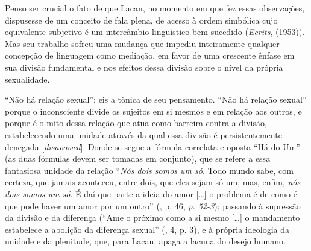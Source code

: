 Penso ser crucial o fato de que Lacan, no momento em que fez essas
observações, dispusesse de um conceito de fala plena, de acesso à ordem
simbólica cujo equivalente subjetivo é um intercâmbio linguístico bem
sucedido (\emph{Ecrits}, (1953)). Mas seu trabalho sofreu uma mudança
que impediu inteiramente qualquer concepção de linguagem como mediação,
em favor de uma crescente ênfase em sua divisão fundamental e nos
efeitos dessa divisão sobre o nível da própria sexualidade.

``Não há relação sexual'': eis a tônica de seu pensamento. ``Não há
relação sexual'' porque o inconsciente divide os sujeitos em si mesmos e
em relação aos outros, e porque é o mito dessa relação que atua como
barreira contra a divisão, estabelecendo uma unidade através da qual
essa divisão é persistentemente denegada {[}\emph{disavowed}{]}. Donde
se segue a fórmula correlata e oposta ``Há do Um'' (as duas fórmulas
devem ser tomadas em conjunto), que se refere a essa fantasiosa unidade
da relação ``\emph{Nós dois somos um só}. Todo mundo sabe, com certeza,
que jamais aconteceu, entre dois, que eles sejam só um, mas, enfim,
\emph{nós dois somos um só}. É daí que parte a ideia do amor {[}\ldots{}{]} o
problema é de como é que pode haver um amor por um outro'' (, p. 46,
\emph{p. 52-3}); passando à supressão da divisão e da diferença (``Ame
o próximo como a si mesmo {[}\ldots{}{]} o mandamento estabelece a abolição
da diferença sexual'' (, 4, p. 3), e à própria ideologia da unidade
e da plenitude, que, para Lacan, apaga a lacuna do desejo humano.

